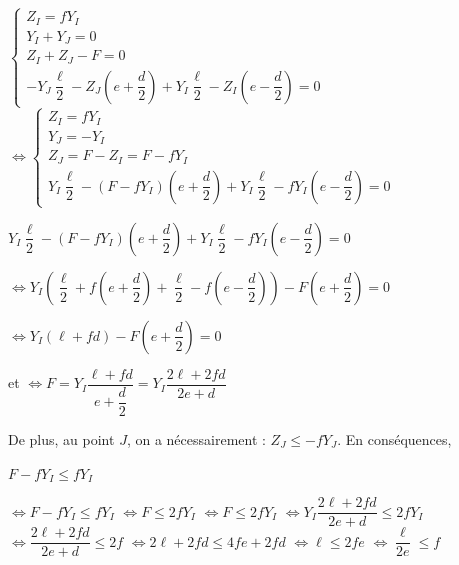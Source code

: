 \documentclass[10pt,fleqn]{article} %
\begin{document}
\begin{multicols}{2}
\begin{corrige}
$
\left\{
\begin{array}{l}
Z_I =  fY_I  \\
Y_I + Y_J = 0 \\
Z_I + Z_J -F = 0 \\ 
-Y_J \dfrac{\ell}{2}-Z_J \left(e+\dfrac{d}{2}\right) 
+Y_I \dfrac{\ell}{2}-Z_I \left(e-\dfrac{d}{2}\right) = 0
\end{array}
\right.$
$
\Leftrightarrow
\left\{
\begin{array}{l}
Z_I =  fY_I  \\
Y_J = -Y_I \\
Z_J=F-Z_I =F-fY_I  \\ 
Y_I \dfrac{\ell}{2}-\left( F-fY_I\right) \left(e+\dfrac{d}{2}\right) 
+Y_I \dfrac{\ell}{2}-fY_I \left(e-\dfrac{d}{2}\right) = 0
\end{array}
\right.$

$Y_I \dfrac{\ell}{2}-\left( F-fY_I\right) \left(e+\dfrac{d}{2}\right) 
+Y_I \dfrac{\ell}{2}-fY_I \left(e-\dfrac{d}{2}\right) = 0$

$\Leftrightarrow Y_I\left(  \dfrac{\ell}{2}+ f \left(e+\dfrac{d}{2}\right) 
+\dfrac{\ell}{2}-f \left(e-\dfrac{d}{2}\right)\right) - F\left(e+\dfrac{d}{2}\right) = 0$

$\Leftrightarrow Y_I\left(  \ell+fd \right) - F\left(e+\dfrac{d}{2}\right) = 0$
 
 et $\Leftrightarrow F = Y_I \dfrac{\ell+fd }{e+\dfrac{d}{2}}= Y_I \dfrac{2\ell+2fd }{2e+d}$

De plus, au point $J$, on a nécessairement : 
$Z_J\leq -fY_J $. En conséquences, 

$F-fY_I \leq fY_I $

$\Leftrightarrow F-fY_I \leq fY_I $
$\Leftrightarrow F \leq 2fY_I $
$\Leftrightarrow F \leq 2fY_I $
$\Leftrightarrow  Y_I \dfrac{2\ell+2fd }{2e+d}\leq 2fY_I $
$\Leftrightarrow  \dfrac{2\ell+2fd }{2e+d}\leq 2f$
$\Leftrightarrow  2\ell+2fd \leq 4f e+2fd $
$\Leftrightarrow  \ell \leq 2f e $
$\Leftrightarrow  \dfrac{\ell}{2e} \leq f $
\end{corrige}


\end{multicols}
\end{document}
